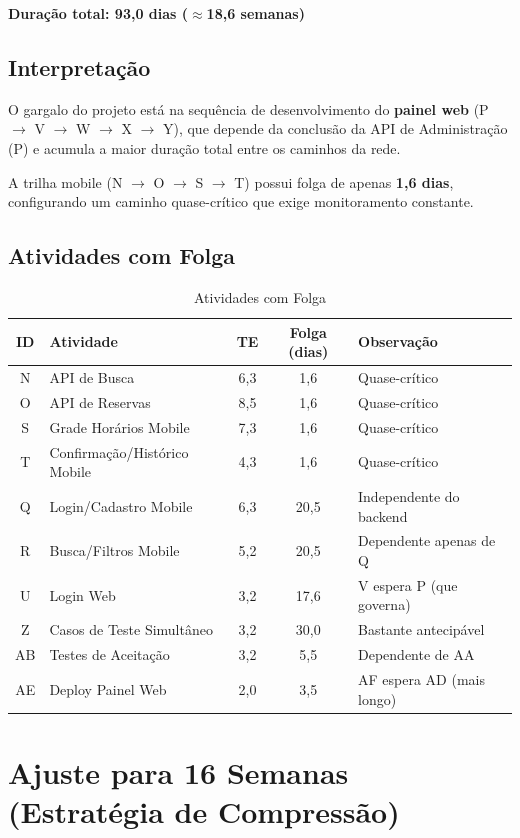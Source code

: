 \documentclass[12pt,a4paper,oneside]{report}
\begin{document}
\textbf{Duração total: 93,0 dias ($\approx$18,6 semanas)}

\subsection{Interpretação}

O gargalo do projeto está na sequência de desenvolvimento do \textbf{painel web} (P $\rightarrow$ V $\rightarrow$ W $\rightarrow$ X $\rightarrow$ Y), que depende da conclusão da API de Administração (P) e acumula a maior duração total entre os caminhos da rede.

A trilha mobile (N $\rightarrow$ O $\rightarrow$ S $\rightarrow$ T) possui folga de apenas \textbf{1,6 dias}, configurando um caminho quase-crítico que exige monitoramento constante.

\subsection{Atividades com Folga}

\begin{table}[htbp]
\centering
\caption{Atividades com Folga}
\begin{tabular}{c p{4.5cm} c c p{3cm}}
\toprule
\textbf{ID} & \textbf{Atividade} & \textbf{TE} & \textbf{Folga (dias)} & \textbf{Observação} \\
\midrule
N & API de Busca & 6,3 & 1,6 & Quase-crítico \\
O & API de Reservas & 8,5 & 1,6 & Quase-crítico \\
S & Grade Horários Mobile & 7,3 & 1,6 & Quase-crítico \\
T & Confirmação/Histórico Mobile & 4,3 & 1,6 & Quase-crítico \\
Q & Login/Cadastro Mobile & 6,3 & 20,5 & Independente do backend \\
R & Busca/Filtros Mobile & 5,2 & 20,5 & Dependente apenas de Q \\
U & Login Web & 3,2 & 17,6 & V espera P (que governa) \\
Z & Casos de Teste Simultâneo & 3,2 & 30,0 & Bastante antecipável \\
AB & Testes de Aceitação & 3,2 & 5,5 & Dependente de AA \\
AE & Deploy Painel Web & 2,0 & 3,5 & AF espera AD (mais longo) \\
\bottomrule
\end{tabular}
\end{table}

\section{Ajuste para 16 Semanas (Estratégia de Compressão)}
\end{document}
